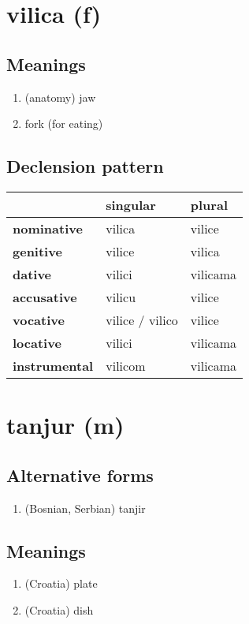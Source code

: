 \filbreak
\section{vilica (f)}
\subsection*{Meanings}
\begin{enumerate}
\item (anatomy) jaw
\item fork (for eating)
\end{enumerate}
\subsection*{Declension pattern}
\begin{tabularx}{\linewidth}{Xll}
\toprule
{} &         singular &    plural \\
\midrule
\textbf{nominative  } &           vilica &    vilice \\
\textbf{genitive    } &           vilice &    vilica \\
\textbf{dative      } &           vilici &  vilicama \\
\textbf{accusative  } &           vilicu &    vilice \\
\textbf{vocative    } &  vilice / vilico &    vilice \\
\textbf{locative    } &           vilici &  vilicama \\
\textbf{instrumental} &          vilicom &  vilicama \\
\bottomrule
\end{tabularx}

\filbreak
\section{tanjur (m)}
\subsection*{Alternative forms}
\begin{enumerate}
\item (Bosnian, Serbian) tanjir
\end{enumerate}
\subsection*{Meanings}
\begin{enumerate}
\item (Croatia) plate
\item (Croatia) dish
\end{enumerate}
